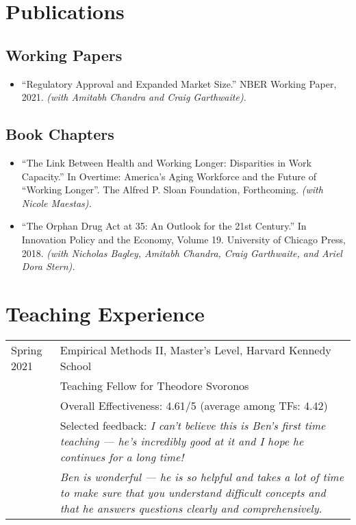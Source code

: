 \documentclass[letterpaper]{article}
\begin{document}
\section*{Publications}
\subsection*{Working Papers}
\begin{itemize}
	\item ``Regulatory Approval and Expanded Market Size.'' NBER Working Paper, 2021. \textit{(with Amitabh Chandra and Craig Garthwaite).}
\end{itemize}

\subsection*{Book Chapters}
\begin{itemize}
	\item ``The Link Between Health and Working Longer: Disparities in Work Capacity.'' In Overtime: America's Aging Workforce and the Future of ``Working Longer''. The Alfred P. Sloan Foundation, Forthcoming. \textit{(with Nicole Maestas).}
	
	\item ``The Orphan Drug Act at 35: An Outlook for the 21st Century.'' In Innovation Policy and the Economy, Volume 19. University of Chicago Press, 2018. \textit{(with Nicholas Bagley, Amitabh Chandra, Craig Garthwaite, and Ariel Dora Stern).}
\end{itemize}

\section*{Teaching Experience}
\begin{tabularx}{\linewidth}{@{}l X}
	Spring 2021 & Empirical Methods II, Master's Level, Harvard Kennedy School \\ 
	& Teaching Fellow for Theodore Svoronos \\
	& Overall Effectiveness: 4.61/5 (average among TFs: 4.42)\\
	& Selected feedback: \textit{I can't believe this is Ben's first time teaching --- he's incredibly good at it and I hope he continues for a long time!} \\
	& \textit{Ben is wonderful --- he is so helpful and takes a lot of time to make sure that you understand difficult concepts and that he answers questions clearly and comprehensively.}
\end{tabularx}
\end{document}
